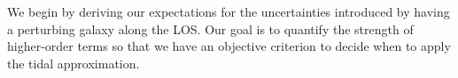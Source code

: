 We begin by deriving our expectations for the uncertainties introduced by having a perturbing galaxy along the LOS. Our goal is to quantify the strength of higher-order terms so that we have an objective criterion to decide when to apply the tidal approximation.